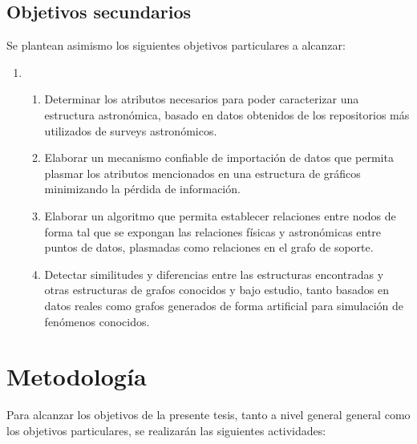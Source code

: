 \documentclass[
	11pt,oneside,a4paper,
	fleqn,
	article
]{memoir}
\begin{document}
\subsection{Objetivos secundarios}

Se plantean asimismo los siguientes objetivos particulares a alcanzar:

\begin{enumerate}\addtocounter{enumi}{1}
	\item[]
	\begin{enumerate}[label*=\arabic{*}]
		\item \label{objetivo:particular1} Determinar los atributos necesarios para poder caracterizar una estructura astronómica, basado en datos obtenidos de los repositorios más utilizados de surveys astronómicos.
		
		\item \label{objetivo:particular2} Elaborar un mecanismo confiable de importación de datos que permita plasmar los atributos mencionados en una estructura de gráficos minimizando la pérdida de información.
		
		\item \label{objetivo:particular3} Elaborar un algoritmo que permita establecer relaciones entre nodos de forma tal que se expongan las relaciones físicas y astronómicas entre puntos de datos, plasmadas como relaciones en el grafo de soporte.
		
		\item \label{objetivo:particular4} Detectar similitudes y diferencias entre las estructuras encontradas y otras estructuras de grafos conocidos y bajo estudio, tanto basados en datos reales como grafos generados de forma artificial para simulación de fenómenos conocidos.
	\end{enumerate}
\end{enumerate}

\section {Metodología}

Para alcanzar los objetivos de la presente tesis, tanto a nivel general general como los objetivos particulares, se realizarán las siguientes actividades:
\end{document}
